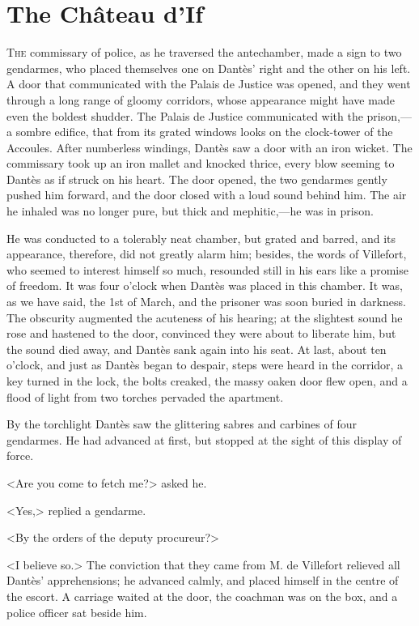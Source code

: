 \chapter{The Château d'If}

 \lettrine{T}{he} commissary of police, as he traversed the antechamber, made a sign to two gendarmes, who placed themselves one on Dantès' right and the other on his left. A door that communicated with the Palais de Justice was opened, and they went through a long range of gloomy corridors, whose appearance might have made even the boldest shudder. The Palais de Justice communicated with the prison,—a sombre edifice, that from its grated windows looks on the clock-tower of the Accoules. After numberless windings, Dantès saw a door with an iron wicket. The commissary took up an iron mallet and knocked thrice, every blow seeming to Dantès as if struck on his heart. The door opened, the two gendarmes gently pushed him forward, and the door closed with a loud sound behind him. The air he inhaled was no longer pure, but thick and mephitic,—he was in prison. 

 He was conducted to a tolerably neat chamber, but grated and barred, and its appearance, therefore, did not greatly alarm him; besides, the words of Villefort, who seemed to interest himself so much, resounded still in his ears like a promise of freedom. It was four o'clock when Dantès was placed in this chamber. It was, as we have said, the 1st of March, and the prisoner was soon buried in darkness. The obscurity augmented the acuteness of his hearing; at the slightest sound he rose and hastened to the door, convinced they were about to liberate him, but the sound died away, and Dantès sank again into his seat. At last, about ten o'clock, and just as Dantès began to despair, steps were heard in the corridor, a key turned in the lock, the bolts creaked, the massy oaken door flew open, and a flood of light from two torches pervaded the apartment. 

 By the torchlight Dantès saw the glittering sabres and carbines of four gendarmes. He had advanced at first, but stopped at the sight of this display of force. 

 <Are you come to fetch me?> asked he. 

 <Yes,> replied a gendarme. 

 <By the orders of the deputy procureur?> 

 <I believe so.> The conviction that they came from M. de Villefort relieved all Dantès' apprehensions; he advanced calmly, and placed himself in the centre of the escort. A carriage waited at the door, the coachman was on the box, and a police officer sat beside him. 

